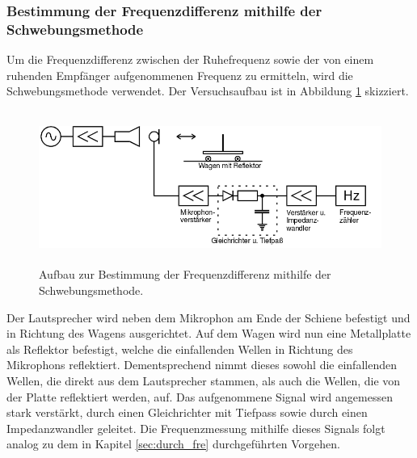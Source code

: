 \subsubsection{Bestimmung der Frequenzdifferenz mithilfe der Schwebungsmethode}
\label{sec:d3}
Um die Frequenzdifferenz zwischen der Ruhefrequenz sowie der von einem ruhenden Empfänger aufgenommenen Frequenz zu ermitteln, wird die Schwebungsmethode verwendet.
Der Versuchsaufbau ist in Abbildung \ref{tfig:3} skizziert.
\begin{figure}
  \centering
  \includegraphics[height=5cm]{aufbau3.png}
  \caption{Aufbau zur Bestimmung der Frequenzdifferenz mithilfe der Schwebungsmethode. \cite{sample}}
  \label{tfig:3}
\end{figure}
Der Lautsprecher wird neben dem Mikrophon am Ende der Schiene befestigt und in Richtung des Wagens ausgerichtet. Auf dem Wagen wird nun eine Metallplatte als Reflektor befestigt, welche die einfallenden Wellen in Richtung des Mikrophons reflektiert.
Dementsprechend nimmt dieses sowohl die einfallenden Wellen, die direkt aus dem Lautsprecher stammen, als auch die Wellen, die von der Platte reflektiert werden, auf.
Das aufgenommene Signal wird angemessen stark verstärkt, durch einen Gleichrichter mit Tiefpass sowie durch einen Impedanzwandler geleitet.
Die Frequenzmessung mithilfe dieses Signals folgt analog zu dem in Kapitel \ref{sec:durch_fre} durchgeführten Vorgehen.

